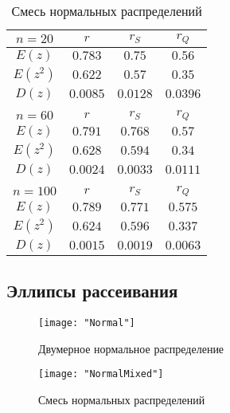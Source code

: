 \documentclass[12pt,a4paper]{article}
\begin{document}
\begin{center}
		\begin{table}[h!]
			\begin{center}
				\begin{tabular}{|c|c|c|c|}
					\hline
					$n = 20$ & $r$ & $r_S$ & $r_Q$\\
					\hline
					$E(z)$ & $0.783$ & $0.75$ & $0.56$ \\
					\hline
					$E(z^2)$ & $0.622$ & $0.57$ & $0.35$ \\
					\hline
					$D(z)$ & $0.0085$ & $0.0128$ & $0.0396$ \\
					\hline
					\multicolumn{4}{c}{ } \\
					\hline
					$n = 60$ & $r$ & $r_S$ & $r_Q$\\
					\hline
					$E(z)$ & $0.791$ & $0.768$ & $0.57$ \\
					\hline
					$E(z^2)$ & $0.628$ & $0.594$ & $0.34$ \\
					\hline
					$D(z)$ & $0.0024$ & $0.0033$ & $0.0111$ \\
					\hline
					\multicolumn{4}{c}{ } \\
					\hline
					$n = 100$ & $r$ & $r_S$ & $r_Q$\\
					\hline
					$E(z)$ & $0.789$ & $0.771$ & $0.575$ \\
					\hline
					$E(z^2)$ & $0.624$ & $0.596$ & $0.337$ \\
					\hline
					$D(z)$ & $0.0015$ & $0.0019$ & $0.0063$ \\
					\hline					
				\end{tabular}
			\caption{Смесь нормальных распределений}
			\end{center}
		\end{table}
	\end{center}

	\newpage
	\subsection{Эллипсы рассеивания}
	\begin{center}
		\begin{figure}[h!]
			\texttt{[image: "Normal"]} 
			\caption[Двумерное нормальное распределение]{Двумерное нормальное распределение}
		\end{figure}
		
		\begin{figure}[h!]
			\texttt{[image: "NormalMixed"]}
			\caption[Смесь нормальных распределений]{Смесь нормальных распределений}
		\end{figure}
	\end{center}
\end{document}
